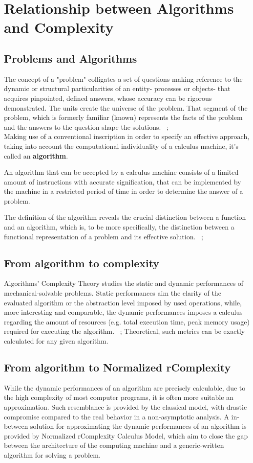 \chapter{Relationship between Algorithms and Complexity}


\section{Problems and Algorithms}
The concept of a "problem" colligates a set of questions making reference to the dynamic or structural particularities of an entity- processes or objects- that acquires pinpointed, defined answers, whose accuracy can be rigorous demonstrated. The units create the universe of the problem. That segment of the problem, which is formerly familiar (known) represents the facts of the problem and the answers to the question shape the solutions. ~\cite{giumale2004introducere};
\\
Making use of a conventional inscription in order to specify an effective approach, taking into account the computational individuality of a calculus machine, it's called an \textbf{algorithm}.

An algorithm that can be accepted by a calculus machine consists of a limited amount of instructions with accurate signification, that can be implemented by the machine in a restricted period of time in order to determine the answer of a problem.

The definition of the algorithm reveals the crucial distinction between a function and an algorithm, which is, to be more specifically, the distinction between a functional representation of a problem and its effective solution. ~\cite{giumale2004introducere};


\section{From algorithm to complexity}
Algorithms' Complexity Theory studies the static and dynamic performances of mechanical-solvable problems. Static performances aim the clarity of the evaluated algorithm or the abstraction level imposed by used operations, while, more interesting and comparable, the dynamic performances imposes a calculus regarding the amount of resources (e.g. total execution time, peak memory usage) required for executing the algorithm. ~\cite{giumale2004introducere}; Theoretical, such metrics can be exactly calculated for any given algorithm.

\section{From algorithm to Normalized rComplexity}
While the dynamic performances of an algorithm are precisely calculable, due to the high complexity of most computer programs, it is often more suitable an approximation. Such resemblance is provided by the classical model, with drastic compromise compared to the real behavior in a non-asymptotic analysis. A in-between solution for approximating the dynamic performances of an algorithm is provided by Normalized rComplexity Calculus Model, which aim to close the gap between the architecture of the computing machine and a generic-written algorithm for solving a problem.

